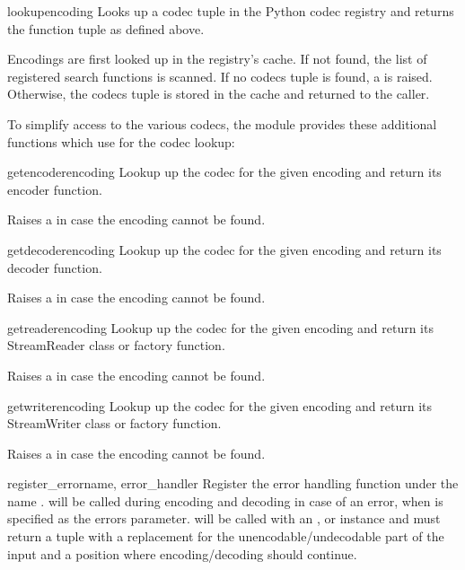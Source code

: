 \begin{funcdesc}{lookup}{encoding}
Looks up a codec tuple in the Python codec registry and returns the
function tuple as defined above.

Encodings are first looked up in the registry's cache. If not found,
the list of registered search functions is scanned. If no codecs tuple
is found, a  is raised. Otherwise, the codecs
tuple is stored in the cache and returned to the caller.
\end{funcdesc}

To simplify access to the various codecs, the module provides these
additional functions which use  for the codec
lookup:

\begin{funcdesc}{getencoder}{encoding}
Lookup up the codec for the given encoding and return its encoder
function.

Raises a  in case the encoding cannot be found.
\end{funcdesc}

\begin{funcdesc}{getdecoder}{encoding}
Lookup up the codec for the given encoding and return its decoder
function.

Raises a  in case the encoding cannot be found.
\end{funcdesc}

\begin{funcdesc}{getreader}{encoding}
Lookup up the codec for the given encoding and return its StreamReader
class or factory function.

Raises a  in case the encoding cannot be found.
\end{funcdesc}

\begin{funcdesc}{getwriter}{encoding}
Lookup up the codec for the given encoding and return its StreamWriter
class or factory function.

Raises a  in case the encoding cannot be found.
\end{funcdesc}

\begin{funcdesc}{register_error}{name, error_handler}
Register the error handling function  under the
name .  will be called during encoding
and decoding in case of an error, when  is specified as the
errors parameter.  will be called with an
,  or
 instance and must return a tuple
with a replacement for the unencodable/undecodable part of the input
and a position where encoding/decoding should continue.
\end{funcdesc}

